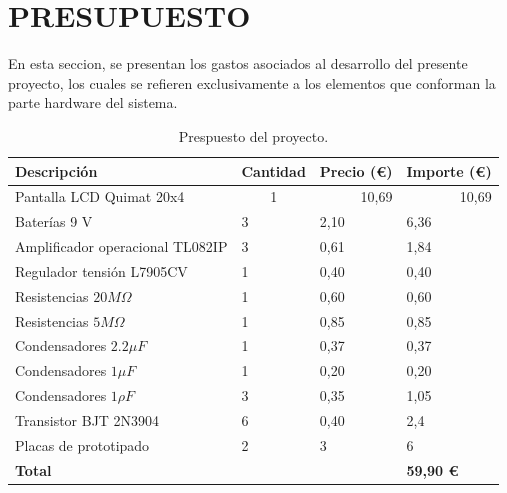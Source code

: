 \chapter*{PRESUPUESTO}
\label{ch:presupuesto}


En esta seccion, se presentan los gastos asociados al desarrollo del presente proyecto, los cuales se refieren exclusivamente a los elementos que conforman la parte hardware del sistema.



\begin{table}[ht]
\centering
\begin{tabular}{ |m{7cm}|m{2cm}|m{2cm}|m{2cm}| }
 \hline
 \rowcolor{LightCyan}
 Descripción & Cantidad & \centering Precio (\euro) & Importe (\euro)\\
 \hline
\multicolumn{1}{|l|}{Pantalla LCD Quimat 20x4} & \multicolumn{1}{|c|}{1} & \multicolumn{1}{|r|}{10,69} & \multicolumn{1}{|r|}{10,69}\\
\hline
Baterías 9 V & 3 & 2,10 & 6,36\\
\hline
Amplificador operacional TL082IP & 3 & 0,61 & 1,84\\
\hline
Regulador tensión L7905CV  & 1 & 0,40 &  0,40\\
\hline
Resistencias $20 M\Omega$ & 1 & 0,60 & 0,60\\
\hline
Resistencias $5M \Omega$ & 1 & 0,85 & 0,85\\
\hline
Condensadores $2.2 \mu F$ & 1 & 0,37 & 0,37 \\
\hline
Condensadores $1 \mu F$ & 1 & 0,20 & 0,20\\
\hline
Condensadores $1 \rho F$ & 3 & 0,35 & 1,05\\
\hline
Transistor BJT 2N3904 & 6 & 0,40 & 2,4 \\
\hline
Placas de prototipado & 2 & 3 & 6\\
\hline
\textbf{Total} &  &  & \textbf{59,90 \euro}\\
\hline
\end{tabular}
\caption{Prespuesto del proyecto.}
\label{tabla:presupuesto}
\end{table}